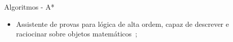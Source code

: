 \begin{frame}{Algoritmos - A*}
    \begin{itemize}
        \item Assistente de provas para lógica de alta ordem, capaz de descrever e raciocinar sobre objetos matemáticos~\cite{geuvers2009proof};
    \end{itemize}
\end{frame}